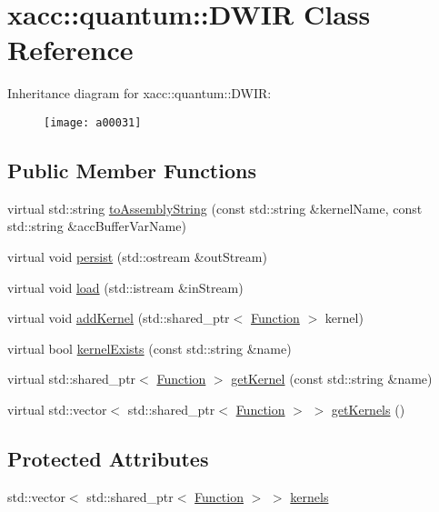\hypertarget{a00031}{}\section{xacc\+:\+:quantum\+:\+:D\+W\+IR Class Reference}
\label{a00031}
Inheritance diagram for xacc\+:\+:quantum\+:\+:D\+W\+IR\+:\begin{figure}[H]
\begin{center}
\leavevmode
\texttt{[image: a00031]}
\end{center}
\end{figure}
\subsection*{Public Member Functions}
\begin{DoxyCompactItemize}
\item 
virtual std\+::string \hyperlink{a00031_a880cb60197577ea31115331e3a030e3e}{to\+Assembly\+String} (const std\+::string \&kernel\+Name, const std\+::string \&acc\+Buffer\+Var\+Name)
\item 
virtual void \hyperlink{a00031_abcbfd0a4cf697843391c65cbd9a82080}{persist} (std\+::ostream \&out\+Stream)
\item 
virtual void \hyperlink{a00031_a8b388d719d565bb902c979807d3d0d47}{load} (std\+::istream \&in\+Stream)
\item 
virtual void \hyperlink{a00031_af1bef18e1e9568d1313b03149aab8c1b}{add\+Kernel} (std\+::shared\+\_\+ptr$<$ \hyperlink{a00038}{Function} $>$ kernel)
\item 
virtual bool \hyperlink{a00031_ab5e8861d3bc0845bb015af6208f5f396}{kernel\+Exists} (const std\+::string \&name)
\item 
virtual std\+::shared\+\_\+ptr$<$ \hyperlink{a00038}{Function} $>$ \hyperlink{a00031_a38d8bdd24250749bc38ad31f8512fcfc}{get\+Kernel} (const std\+::string \&name)
\item 
virtual std\+::vector$<$ std\+::shared\+\_\+ptr$<$ \hyperlink{a00038}{Function} $>$ $>$ \hyperlink{a00031_a66e22c5dc95ec46045476864012ad08f}{get\+Kernels} ()
\end{DoxyCompactItemize}
\subsection*{Protected Attributes}
\begin{DoxyCompactItemize}
\item 
std\+::vector$<$ std\+::shared\+\_\+ptr$<$ \hyperlink{a00038}{Function} $>$ $>$ \hyperlink{a00031_abcb04ec3a152c3f22e5a757a9aecabf2}{kernels}
\end{DoxyCompactItemize}


